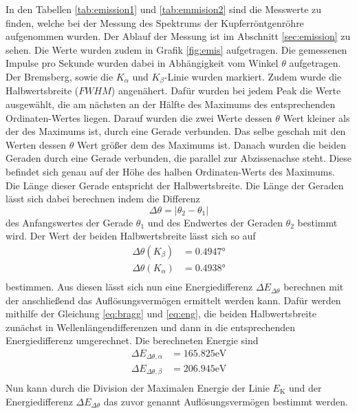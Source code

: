 In den Tabellen \ref{tab:emission1} und \ref{tab:emmision2} sind die Messwerte zu finden, welche bei der Messung des Spektrums der Kupferröntgenröhre aufgenommen wurden.
Der Ablauf der Messung ist im Abschnitt \ref{sec:emission} zu sehen.
Die Werte wurden zudem in Grafik \ref{fig:emis} aufgetragen.
Die gemessenen Impulse pro Sekunde wurden dabei in Abhängigkeit vom Winkel $\theta$ aufgetragen.
Der Bremsberg, sowie die $K_\alpha$ und $K_\beta$-Linie wurden markiert.
Zudem wurde die Halbwertsbreite ($FWHM$) angenähert.
Dafür wurden bei jedem Peak die Werte ausgewählt, die am nächsten an der Hälfte des Maximums des entsprechenden Ordinaten-Wertes liegen.
Darauf wurden die zwei Werte dessen $\theta$ Wert kleiner als der des Maximums ist, durch eine Gerade verbunden.
Das selbe geschah mit den Werten dessen $\theta$ Wert größer dem des Maximums ist.
Danach wurden die beiden Geraden durch eine Gerade verbunden, die parallel zur Abzissenachse steht.
Diese befindet sich genau auf der Höhe des halben Ordinaten-Werts des Maximums.
Die Länge dieser Gerade entspricht der Halbwertsbreite.
Die Länge der Geraden lässt sich dabei berechnen indem die Differenz 
\begin{equation*}
  \Delta \theta = \left | \theta_2-\theta_1 \right |
\end{equation*}
des Anfangswertes der Gerade $\theta_1$ und des Endwertes der Geraden $\theta_2$ bestimmt wird.
Der Wert der beiden Halbwertsbreite lässt sich so auf
\begin{align*}
    \Delta \theta(K_\beta) &=  0.4947 \si{\degree} \\
    \Delta \theta(K_\alpha) &=  0.4938 \si{\degree} \\
\end{align*}
bestimmen.
Aus diesen lässt sich nun eine Energiedifferenz $\Delta E_{\Delta\theta}$ berechnen mit der anschließend das Auflösungsvermögen ermittelt werden kann.
Dafür werden mithilfe der Gleichung \eqref{eq:bragg} und \eqref{eq:eng}, die beiden Halbwertsbreite zunächst in Wellenlängendifferenzen und dann in die entsprechenden Energiedifferenz umgerechnet.
Die berechneten Energie sind
\begin{align*}
    \Delta E_{\Delta\theta, \alpha} &= 165.825\si{\eV}\\
    \Delta E_{\Delta\theta, \beta}  &= 206.945\si{\eV}\\
\end{align*}
Nun kann durch die Division der Maximalen Energie der Linie $E_\text{K}$ und der Energiedifferenz $\Delta E_{\Delta\theta}$ das zuvor genannt Auflösungsvermögen bestimmt werden.
